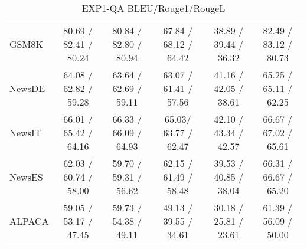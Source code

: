 \begin{table*}[tb]
{\begin{tabular}{lccccc}
    GSM8K & 80.69 / 82.41 / 80.24& 80.84 / 82.80 / 80.94& 67.84 / 68.12  / 64.42& 38.89 / 39.44  / 36.32& 82.49 / 83.12 / 80.73\\
    NewsDE & 64.08 / 62.82  / 59.28& 63.64 / 62.69 / 59.11& 63.07 / 61.41 / 57.56& 41.16 / 42.05  / 38.61& 65.25 / 65.11  / 62.25
\\
    NewsIT & 66.01 / 65.42  / 64.16& 66.33 / 66.09  / 64.93& 65.03/ 63.77 / 62.47& 42.10 / 43.34 / 42.57& 66.67 / 67.02  / 65.61
\\
    NewsES & 62.03 / 60.74  / 58.00& 59.70 /  59.31 / 56.62& 62.15 / 61.49  / 58.48& 39.53 / 40.85  / 38.04& 66.31 / 66.67  / 65.20
\\
    ALPACA & 59.05 / 53.17 / 47.45& 59.73 / 54.38 / 49.11& 49.13 / 39.55  / 34.61& 30.18 / 25.81  / 23.61& 61.39 / 56.09  / 50.00\\
    \bottomrule
    \end{tabular}}
   \caption{EXP1-QA BLEU/Rouge1/RougeL}
    \label{tab:EXP1-QA}
\end{table*}

